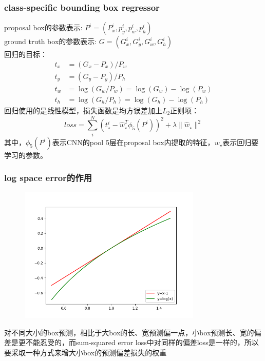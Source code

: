 \documentclass{beamer}
\begin{document}
    \begin{frame}
        \frametitle{class-specific bounding box regressor}
        proposal box的参数表示: $P^i=(P_x^i,p_y^i,p_w^i,p_h^i)$ \\
        ground truth box的参数表示: $G=(G_x^i,G_y^i,G_w^i,G_h^i)$ \\
        回归的目标： \\
        $$\begin{aligned} 
            t_x &= (G_x-P_x)/P_w \\
            t_y &= (G_y-P_y)/P_h \\
            t_w &= \log(G_w/P_w)=\log(G_w)-\log(P_w) \\
            t_h &= \log(G_h/P_h)=\log(G_h)-\log(P_h)
        \end{aligned}$$
        \vspace{6pt}
        回归使用的是线性模型，损失函数是均方误差加上$L_2$正则项： 
        $$loss=\sum_i^N (t_{\star}^i-\hat w_{\star}^T \phi_5(P^i))^2+\lambda\|\hat w_{\star}\|^2$$
        \scriptsize{其中，$\phi_5(P^i)$表示CNN的pool 5层在proposal box内提取的特征，$w_{\star}$表示回归要学习的参数。}
    \end{frame}
    
    \begin{frame}
        \frametitle{log space error的作用}
        \begin{figure}
            \centering
            \includegraphics[height=6.5cm]{../graphic/log.png}
        \end{figure}
        \scriptsize{对不同大小的box预测，相比于大box的长、宽预测偏一点，小box预测长、宽的偏差是更不能忍受的，而sum-squared error loss中对同样的偏差loss是一样的，所以要采取一种方式来增大小box的预测偏差损失的权重}
    \end{frame}
\end{document}
